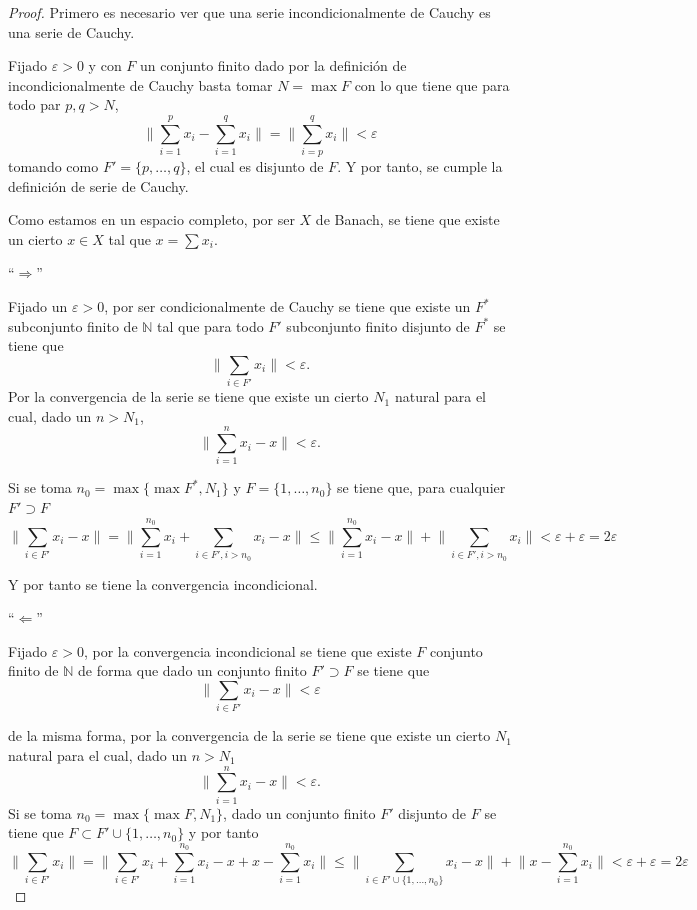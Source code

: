 		\begin{proof}
			Primero es necesario ver que una serie incondicionalmente de Cauchy es una serie de Cauchy.
			
			Fijado $\varepsilon >0$ y con $F$ un conjunto finito dado por la definición de incondicionalmente de Cauchy basta tomar $N = \max F$ con lo que tiene que para todo par $p,q > N$, 
			\[\big\| \sum_{i=1}^{p}{x_i} - \sum_{i=1}^{q}{x_i}  \big\| = \big\| \sum_{i=p}^{q}{x_i} \big\| < \varepsilon\]
			tomando como $F' =\{p,\ldots, q\}$, el cual es disjunto de $F$. Y por tanto, se cumple la definición de serie de Cauchy. 
			
			Como estamos en un espacio completo, por ser $X$ de Banach, se tiene que existe un cierto $x \in X$ tal que $x = \sum{x_i}$. 
			
			\noindent ``$\Longrightarrow$''
			
			Fijado un $\varepsilon > 0$, por ser condicionalmente de Cauchy se tiene que existe un $F^*$ subconjunto finito de $\mathbb{N}$ tal que para todo $F'$ subconjunto finito disjunto de $F^*$ se tiene que 
			\[\big\| \displaystyle \sum_{i \in F'}{x_i} \big\| < \varepsilon.\]
			Por la convergencia de la serie se tiene que existe un cierto $N_1$ natural para el cual, dado un $n>N_1$,
			\[\big\| \sum_{i=1}^{n}{x_i} - x \big\| < \varepsilon.\]
			
			Si se toma $n_0 = \max \{ \max F^*, N_1\}$ y $F= \{1, \ldots, n_0\}$ se tiene que, para cualquier $F' \supset F$  
			\[\big\| \sum_{i \in F'}{x_i} - x \big\| = \big\| \sum_{i=1}^{n_0}{x_i} + \sum_{i \in F', i > n_0}{x_i} - x\big\| \leq \big\| \sum_{i=1}^{n_0}{x_i} -x\big\| + \big\| \sum_{i \in F', i > n_0}{x_i}\big\| < \varepsilon + \varepsilon = 2\varepsilon\]
			
			Y por tanto se tiene la convergencia incondicional.
			
			\noindent ``$\Longleftarrow$''
			
			Fijado $\varepsilon >0$, por la convergencia incondicional se tiene que existe $F$ conjunto finito de $\mathbb{N}$ de forma que dado un conjunto finito $F' \supset F$ se tiene que 
			$$\big\| \sum_{i \in F'}{x_i} - x \big\| < \varepsilon$$
			
			de la misma forma, por la convergencia de la serie se tiene que existe un cierto $N_1$ natural para el cual, dado un $n>N_1$ 
			\[\big\| \sum_{i=1}^{n}{x_i} - x \big\| < \varepsilon.\]
			Si se toma $n_0 = \max \{ \max F, N_1\}$, dado un conjunto finito $F'$ disjunto de $F$ se tiene que $F \subset F' \cup \{1, \ldots, n_0\}$ y por tanto
			\[\big\| \sum_{i\in F'}{x_i} \big\| = \big\| \sum_{i \in F'}{x_i} + \sum_{i=1}^{n_0}{x_i} - x + x - \sum_{i=1}^{n_0}{x_i} \big\| \leq \big\| \sum_{i \in F' \cup \{1,\ldots,n_0\}}{x_i}  - x \big\| + \big\| x - \sum_{i=1}^{n_0}{x_i} \big\| < \varepsilon + \varepsilon = 2\varepsilon\]
			
		\end{proof}
	
